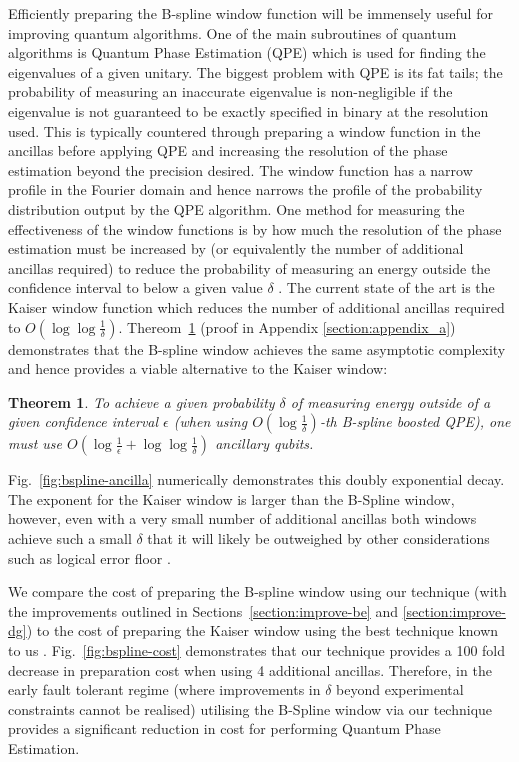 \documentclass[aps,prx,twocolumn,floatfix,10pt,amssymb,amsfont,amsmath,superscriptaddress,float,nofootinbib,longbibliography,nobalancelastpage]{revtex4-2}
\newtheorem{theorem}{Theorem}
\theoremstyle{empty}
\begin{document}
Efficiently preparing the B-spline window function will be immensely useful for improving quantum algorithms. One of the main subroutines of quantum algorithms is Quantum Phase Estimation (QPE) which is used for finding the eigenvalues of a given unitary. The biggest problem with QPE is its fat tails; the probability of measuring an inaccurate eigenvalue is non-negligible if the eigenvalue is not guaranteed to be exactly specified in binary at the resolution used. This is typically countered through preparing a window function in the ancillas before applying QPE and increasing the resolution of the phase estimation beyond the precision desired. The window function has a narrow profile in the Fourier domain and hence narrows the profile of the probability distribution output by the QPE algorithm. One method for measuring the effectiveness of the window functions is by how much the resolution of the phase estimation must be increased by (or equivalently the number of additional ancillas required) to reduce the probability of measuring an energy outside the confidence interval to below a given value $\delta$ \cite{Greenaway:2024jzs}. The current state of the art is the Kaiser window function \cite{Berry:2022ccu} which reduces the number of additional ancillas required to $O(\log \log \frac{1}{\delta})$. Thereom~\ref{theroem:b_spline} (proof in Appendix \ref{section:appendix_a}) demonstrates that the B-spline window achieves the same asymptotic complexity and hence provides a viable alternative to the Kaiser window: 

\begin{theorem}
\label{theroem:b_spline}
To achieve a given probability $\delta$ of measuring energy outside of a given confidence interval $\epsilon$ (when using $O(\log \frac{1}{\delta})$-th B-spline boosted QPE), one must use $O(\log \frac{1}{\epsilon} + \log \log \frac{1}{\delta})$ ancillary qubits.
\end{theorem}

Fig.~\ref{fig:bspline-ancilla} numerically demonstrates this doubly exponential decay. The exponent for the Kaiser window is larger than the B-Spline window, however, even with a very small number of additional ancillas both windows achieve such a small $\delta$ that it will likely be outweighed by other considerations such as logical error floor \cite{Acharya:2024btg}.

We compare the cost of preparing the B-spline window using our technique (with the improvements outlined in Sections~\ref{section:improve-be} and \ref{section:improve-dg}) to the cost of preparing the Kaiser window using the best technique known to us \cite{mcardleQuantumStatePreparation2022, Greenaway:2024jzs}. Fig.~\ref{fig:bspline-cost} demonstrates that our technique provides a 100 fold decrease in preparation cost when using 4 additional ancillas. Therefore, in the early fault tolerant regime (where improvements in $\delta$ beyond experimental constraints cannot be realised) utilising the B-Spline window via our technique provides a significant reduction in cost for performing Quantum Phase Estimation.
\end{document}
